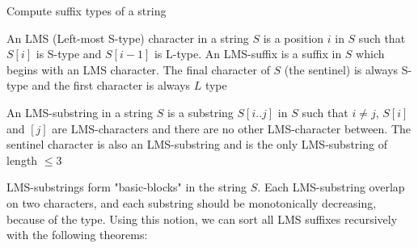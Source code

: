 \begin{algorithm}[htp]
  \SetAlgoLined\DontPrintSemicolon

  \vspace{0.5cm}
  \caption{Compute suffix types of a string}
  \label{alg:suffixtypes}
\end{algorithm}


\begin{definition}

    An LMS (Left-most S-type) character in a string $S$ is a position $i$ in $S$ such that
    $S[i]$ is S-type and $S[i-1]$ is L-type. An LMS-suffix is a suffix in $S$ which begins
    with an LMS character. The final character of $S$ (the sentinel) is always S-type and
    the first character is always $L$ type

\end{definition}

\begin{definition}

    An LMS-substring in a string $S$ is a substring $S[i..j]$ in $S$ such that $i \neq j$,
    $S[i]$ and $[j]$ are LMS-characters and there are no other LMS-character between. The
    sentinel character is also an LMS-substring and is the only LMS-substring of length
    $\leq 3$

\end{definition}

LMS-substrings form "basic-blocks" in the string $S$. Each LMS-substring overlap on two
characters, and each substring should be monotonically decreasing, because of the type.
Using this notion, we can sort all LMS suffixes recursively with the following theorems:

